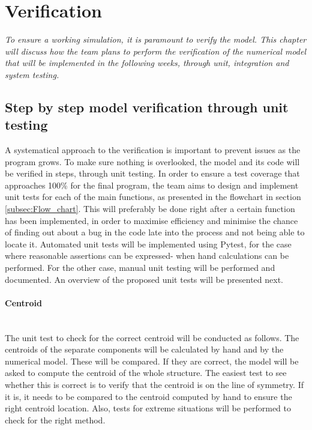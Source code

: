 \section{Verification}
\label{sec:verification}
\textit{To ensure a working simulation, it is paramount to verify the model. This chapter will discuss how the team plans to perform the verification of the numerical model that will be implemented in the following weeks, through unit, integration and system testing.}

\subsection{Step by step model verification through unit testing}
A systematical approach to the verification is important to prevent issues as the program grows. To make sure nothing is overlooked, the model and its code will be verified in steps, through unit testing. In order to ensure a test coverage that approaches 100\% for the final program, the team aims to design and implement unit tests for each of the main functions, as presented in the flowchart in section \autoref{subsec:Flow_chart}. This will preferably be done right after a certain function has been implemented, in order to maximise efficiency and minimise the chance of finding out about a bug in the code late into the process and not being able to locate it. Automated unit tests will be implemented using Pytest, for the case where reasonable assertions can be expressed- when hand calculations can be performed. For the other case, manual unit testing will be performed and documented. An overview of the proposed unit tests will be presented next. 

\paragraph{Centroid}
\\The unit test to check for the correct centroid will be conducted as follows. The centroids of the separate components will be calculated by hand and by the numerical model. These will be compared. If they are correct, the model will be asked to compute the centroid of the whole structure. The easiest test to see whether this is correct is to verify that the centroid is on the line of symmetry. If it is, it needs to be compared to the centroid computed by hand to ensure the right centroid location. Also, tests for extreme situations will be performed to check for the right method.

